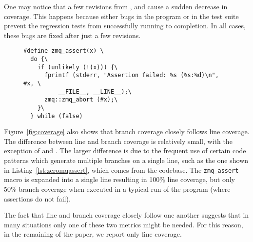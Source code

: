 
One may notice that a few revisions from \lighttpdtwo, \memcached and \redis
cause a sudden decrease in coverage. This happens because either bugs in the
program or in the test suite prevent the regression tests from
successfully running to completion. In all cases, these bugs are fixed
after just a few revisions.

\begin{figure}[t]
\begin{lstlisting}[label=lst:zeromqassert,basicstyle=\footnotesize\ttfamily,xleftmargin=0pt,numbers=none,caption={Example of an assertion macro used in \zeromq codebase.}]
#define zmq_assert(x) \
  do {\
    if (unlikely (!(x))) {\
      fprintf (stderr, "Assertion failed: %s (%s:%d)\n", #x, \
          __FILE__, __LINE__);\
      zmq::zmq_abort (#x);\
    }\
  } while (false)
\end{lstlisting}
\end{figure}

Figure~\ref{fig:coverage} also shows that branch coverage closely
follows line coverage.  The difference between line and branch
coverage is relatively small, with the exception of \memcached
and \zeromq. The larger difference is due to the frequent use of
certain code patterns which generate multiple branches on a single
line, such as the one shown in Listing~\ref{lst:zeromqassert}, which
comes from the \zeromq codebase.  The \lstinline`zmq_assert` macro is
expanded into a single line resulting in 100\% line coverage, but only
50\% branch coverage when executed in a typical run of the program
(where assertions do not fail).

The fact that line and branch coverage closely follow one another
suggests that in many situations only one of these two metrics might be
needed.  For this reason, in the remaining of the paper, we report
only line coverage.

